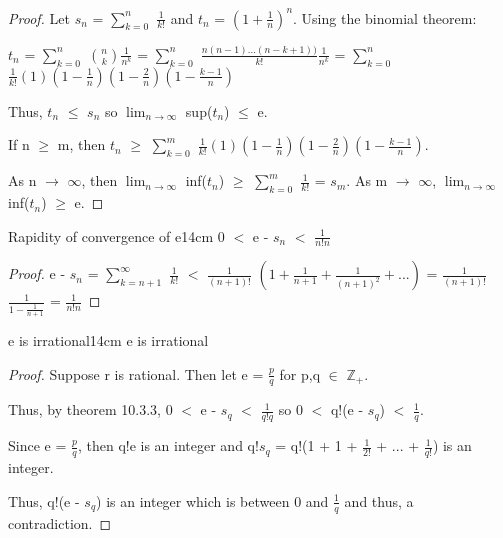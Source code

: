     \begin{proof}
        Let $s_n$ = $\sum_{k=0}^n$ $\frac{1}{k!}$ and
        $t_n$ = $(1 + \frac{1}{n})^n$.
        Using the binomial theorem:

        \hspace{1cm}
        $t_n$ = $\sum_{k=0}^n$ $\binom{n}{k} \frac{1}{n^k}$
        = $\sum_{k=0}^n$ $\frac{n(n-1)...(n-k+1))}{k!} \frac{1}{n^k}$
        = $\sum_{k=0}^n$ $\frac{1}{k!}
                        (1) (1 - \frac{1}{n}) (1 - \frac{2}{n}) (1 - \frac{k-1}{n})$
        
        Thus, $t_n$ $\leq$ $s_n$ so
        $\lim_{n \rightarrow \infty}$ sup($t_n$) $\leq$ e.

        If n $\geq$ m, then
        $t_n$ $\geq$
        $\sum_{k=0}^m$ $\frac{1}{k!}
                        (1) (1 - \frac{1}{n}) (1 - \frac{2}{n}) (1 - \frac{k-1}{n})$.
        
        As n $\rightarrow$ $\infty$, then
        $\lim_{n \rightarrow \infty}$ inf($t_n$)
        $\geq$ $\sum_{k=0}^m$ $\frac{1}{k!}$
        = $s_m$.
        As m $\rightarrow$ $\infty$,
        $\lim_{n \rightarrow \infty}$ inf($t_n$) $\geq$ e.
    \end{proof}

    \vspace{0.5cm}



    \begin{wtheorem}{Rapidity of convergence of e}{14cm}
        0 $<$ e - $s_n$ $<$ $\frac{1}{n!n}$
    \end{wtheorem}

    \begin{proof}
        e - $s_n$
        = $\sum_{k=n+1}^{\infty}$ $\frac{1}{k!}$
        $<$ $\frac{1}{(n+1)!}$ $(1 + \frac{1}{n+1} + \frac{1}{(n+1)^2} + ...)$
        = $\frac{1}{(n+1)!}$ $\frac{1}{1 - \frac{1}{n+1}}$
        = $\frac{1}{n!n}$
    \end{proof}

    \newpage



    \begin{wtheorem}{e is irrational}{14cm}
        e is irrational
    \end{wtheorem}

    \begin{proof}
        Suppose r is rational.
        Then let e = $\frac{p}{q}$ for p,q $\in$ $\mathbb{Z}_+$.

        Thus, by {\color{red} theorem 10.3.3},
        0 $<$ e - $s_q$ $<$ $\frac{1}{q!q}$ so
        0 $<$ q!(e - $s_q$) $<$ $\frac{1}{q}$.

        Since e = $\frac{p}{q}$, then q!e is an integer and
        q!$s_q$ = q!(1 + 1 + $\frac{1}{2!}$ + ... + $\frac{1}{q!}$)
        is an integer.
        
        Thus, q!(e - $s_q$) is an integer which is between 0 and $\frac{1}{q}$
        and thus, a contradiction.
    \end{proof}


